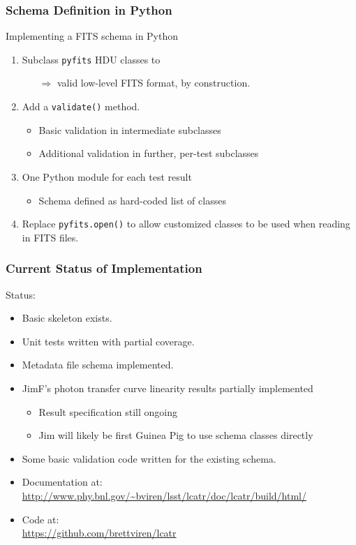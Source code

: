 \documentclass[xcolor=dvipsnames]{beamer}
\begin{document}
\begin{frame}
  \frametitle{Schema Definition in Python}

  Implementing a FITS schema in Python

  \vspace{5mm}

  \begin{enumerate}
  \item Subclass \texttt{pyfits} HDU classes to 
    \begin{itemize}
    \item[$\Rightarrow$] valid low-level FITS format, by construction.
    \end{itemize}
  \item Add a \texttt{validate()} method.
    \begin{itemize}
    \item Basic validation in intermediate subclasses
    \item Additional validation in further, per-test subclasses
    \end{itemize}
  \item One Python module for each test result
    \begin{itemize}
    \item  Schema defined as hard-coded list of classes
    \end{itemize}
  \item Replace \texttt{pyfits.open()} to allow customized classes to
    be used when reading in FITS files.
  \end{enumerate}

\end{frame}

\begin{frame}
  \frametitle{Current Status of Implementation}

  Status:
  \begin{itemize}
  \item Basic skeleton exists.
  \item Unit tests written with partial coverage.
  \item Metadata file schema implemented.
  \item JimF's photon transfer curve linearity results partially
    implemented
    \begin{itemize}
    \item Result specification still ongoing
    \item Jim will likely be first Guinea Pig to use schema classes directly
    \end{itemize}
  \item Some basic validation code written for the existing schema. 
  \item Documentation at:\\
    {\footnotesize
    \url{http://www.phy.bnl.gov/~bviren/lsst/lcatr/doc/lcatr/build/html/}}
  \item Code at:\\
    {\footnotesize
    \url{https://github.com/brettviren/lcatr}}
  \end{itemize}

\end{frame}
\end{document}
